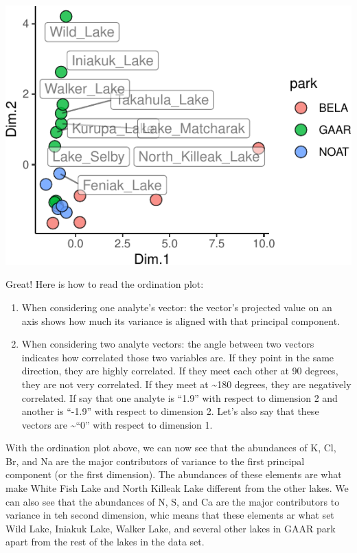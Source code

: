 \documentclass[
]{krantz}
\begin{document}
\begin{center}\includegraphics{index_files/figure-latex/unnamed-chunk-96-1} \end{center}

Great! Here is how to read the ordination plot:

\begin{enumerate}
\def\labelenumi{\arabic{enumi}.}
\item
  When considering one analyte's vector: the vector's projected value on an axis shows how much its variance is aligned with that principal component.
\item
  When considering two analyte vectors: the angle between two vectors indicates how correlated those two variables are. If they point in the same direction, they are highly correlated. If they meet each other at 90 degrees, they are not very correlated. If they meet at \textasciitilde180 degrees, they are negatively correlated. If say that one analyte is ``1.9'' with respect to dimension 2 and another is ``-1.9'' with respect to dimension 2. Let's also say that these vectors are \textasciitilde{}``0'' with respect to dimension 1.
\end{enumerate}

With the ordination plot above, we can now see that the abundances of K, Cl, Br, and Na are the major contributors of variance to the first principal component (or the first dimension). The abundances of these elements are what make White Fish Lake and North Killeak Lake different from the other lakes. We can also see that the abundances of N, S, and Ca are the major contributors to variance in teh second dimension, whic means that these elements ar what set Wild Lake, Iniakuk Lake, Walker Lake, and several other lakes in GAAR park apart from the rest of the lakes in the data set.
\end{document}
